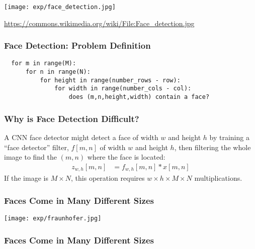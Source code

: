 \documentclass{beamer}
\begin{document}
\begin{frame}
  \centerline{\texttt{[image: exp/face\_detection.jpg]}}
  \url{https://commons.wikimedia.org/wiki/File:Face_detection.jpg}
\end{frame}

\begin{frame}
  \frametitle{Face Detection: Problem Definition}

\begin{verbatim}
  for m in range(M):
      for n in range(N):
          for height in range(number_rows - row):
              for width in range(number_cols - col):
                  does (m,n,height,width) contain a face?
\end{verbatim}
\end{frame}

\begin{frame}
  \frametitle{Why is Face Detection Difficult?}

  A CNN face detector might detect a face of width $w$ and height $h$
  by training a ``face detector'' filter, $f[m,n]$ of width $w$
  and height $h$, then filtering the whole image to find the $(m,n)$
  where the face is located:
  \begin{align*}
    z_{w,h}[m,n] &= f_{w,h}[m,n] \ast x[m,n]
  \end{align*}
  If the image is $M\times N$, this operation requires $w\times
  h\times M\times N$ multiplications.
\end{frame}
\begin{frame}
  \frametitle{Faces Come in Many Different Sizes}
  \centerline{\texttt{[image: exp/fraunhofer.jpg]}}
\end{frame}

\begin{frame}
  \frametitle{Faces Come in Many Different Sizes}
\end{frame}
\end{document}
